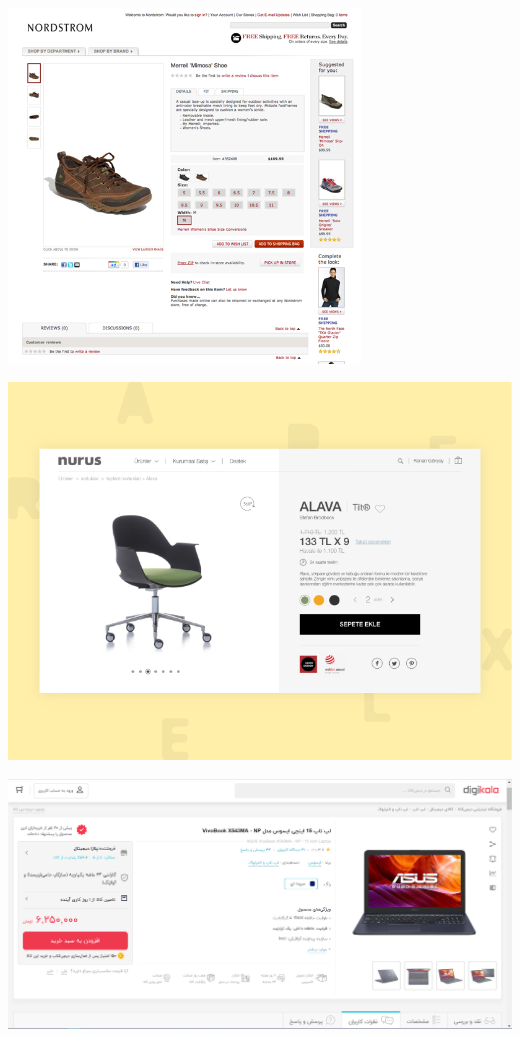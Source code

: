 \documentclass[]{article}
\begin{document}
\begin{center}
\includegraphics[width=0.7\textwidth]{images/image22.png}
\end{center}


\begin{center}
\includegraphics[width=1.0\textwidth]{images/image23.png}
\end{center}



\begin{center}
\includegraphics[width=1.0\textwidth]{images/image24.png}
\end{center}
\end{document}
